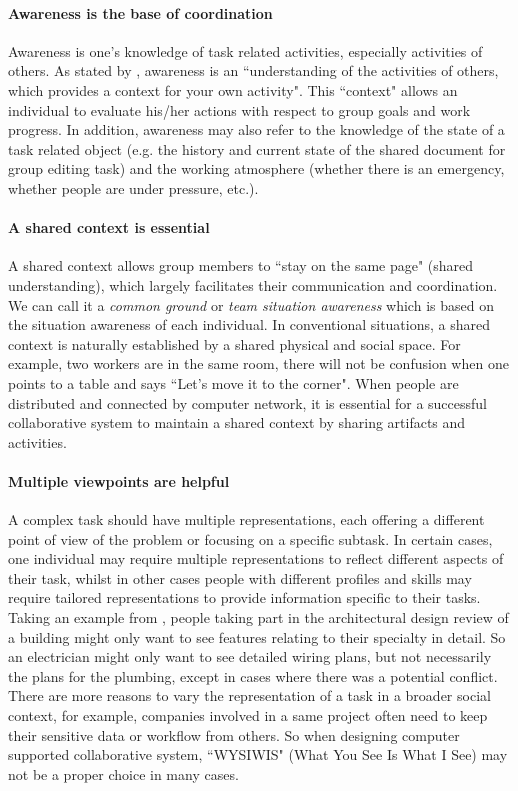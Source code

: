 \paragraph{Awareness is the base of coordination} Awareness is one's knowledge of task related activities, especially activities of others. As stated by \citet{Dourish1992Awareness}, awareness is an ``understanding of the activities of others, which provides a context for your own activity". This ``context" allows an individual to evaluate his/her actions with respect to group goals and work progress. In addition, awareness may also refer to the knowledge of the state of a task related object (e.g. the history and current state of the shared document for group editing task) and the working atmosphere (whether there is an emergency, whether people are under pressure, etc.).


\paragraph{A shared context is essential} A shared context allows group members to ``stay on the same page" (shared understanding), which largely facilitates their communication and coordination. We can call it a \textit{common ground} \citep{Clark1991Grounding} or \textit{team situation awareness} \citep{Salas1995SA} which is based on the situation awareness of each individual. In conventional situations, a shared context is naturally established by a shared physical and social space. For example, two workers are in the same room, there will not be confusion when one points to a table and says ``Let's move it to the corner". When people are distributed and connected by computer network, it is essential for a successful collaborative system to maintain a shared context by sharing artifacts and activities.

\paragraph{Multiple viewpoints are helpful} A complex task should have multiple representations, each offering a different point of view of the problem or focusing on a specific subtask. In certain cases, one individual may require multiple representations to reflect different aspects of their task, whilst in other cases people with different profiles and skills may require tailored representations to provide information specific to their tasks. Taking an example from \citet{Churchill1998CVE}, people taking part in the architectural design review of a building might only want to see features relating to their specialty in detail. So an electrician might only want to see detailed wiring plans, but not necessarily the plans for the plumbing, except in cases where there was a potential conflict. There are more reasons to vary the representation of a task in a broader social context, for example, companies involved in a same project often need to keep their sensitive data or workflow from others. So when designing computer supported collaborative system, ``WYSIWIS" (What You See Is What I See) \citep{Stefik1987WYSIWIS} may not be a proper choice in many cases.

